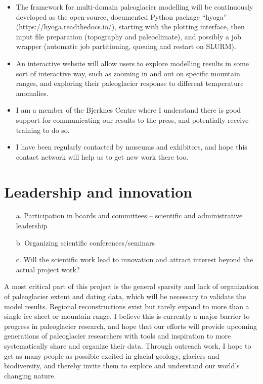 \documentclass{article}
\newcommand{\guideline}[1]{{\color{color2}\itshape{#1}}}
\begin{document}
    \begin{itemize}
      \item The framework for multi-domain paleoglacier modelling will be
        continuously developed as the open-source, documented Python package
        ``hyoga'' (https://hyoga.readthedocs.io/), starting with the plotting
        interface, then input file preparation (topography and paleoclimate),
        and possibly a job wrapper (automatic job partitioning, queuing and
        restart on SLURM).
      \item An interactive website will allow users to explore modelling
        results in some sort of interactive way, such as zooming in and out on
        specific mountain ranges, and exploring their paleoglacier response to
        different temperature anomalies.
      \item I am a member of the Bjerknes Centre where I understand there is
        good support for communicating our results to the press, and
        potentially receive training to do so.
      \item I have been regularly contacted by museums and exhibitors, and hope
        this contact network will help us to get new work there too.
    \end{itemize}


\section{Leadership and innovation}

    \guideline{
        \begin{itemize}
          \item[a.] Participation in boards and committees – scientific and
            administrative leadership
          \item[b.] Organizing scientific conferences/seminars
          \item[c.] Will the scientific work lead to innovation and attract
            interest beyond the actual project work?
        \end{itemize}}

    A most critical part of this project is the general sparsity and lack of
    organization of paleoglacier extent and dating data, which will be
    necessary to validate the model results. Regional reconstructions exist but
    rarely expand to more than a single ice sheet or mountain range. I believe
    this is currently a major barrier to progress in paleoglacier research, and
    hope that our efforts will provide upcoming generations of paleoglacier
    researchers with tools and inspiration to more systematically share and
    organize their data. Through outreach work, I hope to get as many people
    as possible excited in glacial geology, glaciers and biodiversity, and
    thereby invite them to explore and understand our world's changing nature.
\end{document}
